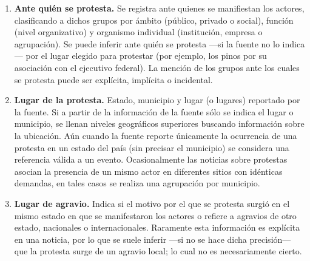 \documentclass[letterpaper, 11pt]{book}
\theoremstyle{definition}
\theoremstyle{remark}
\begin{document}
\begin{enumerate}
    
    Por último, a pesar de que nuestros datos tienen una acotación temporal que difícilmente registra ``cambios históricos''\footnote{
	Argumentación central de \citet{2003_Wada_Tesis} para justificar un \emph{análisis de demandas}, dado que diversos investigadores han considerado que las demandas reportadas por los diarios no son fidedignas, ya que son sesgadas por las impresiones de los reporteros. 
    } 
    encontramos que la justificación sobre ``filtrar demandas significativas ante una multiplicidad de discursos'' \citep[168]{2003_Wada_Tesis} es válida, considerando además que las clasificaciones establecidas funcionan adecuadamente como descripciones, enfatizadas dentro de la esfera pública. 
    
    
    
    \item \textbf{Ante quién se protesta.} Se registra ante quienes se manifiestan los actores, clasificando a dichos grupos por ámbito (público, privado o social), función (nivel organizativo) y organismo individual (institución, empresa o agrupación). 
    Se puede inferir ante quién se protesta ---si la fuente no lo indica--- por el lugar elegido para protestar (por ejemplo, los pinos por su asociación con el ejecutivo federal). La mención de los grupos ante los cuales se protesta puede ser explícita, implícita o incidental.
    

    \item \textbf{Lugar de la protesta.} Estado, municipio y lugar (o lugares) reportado por la fuente. 
    Si a partir de la información de la fuente sólo se indica el lugar o municipio, se llenan niveles geográficos superiores buscando información sobre la ubicación. 
    Aún cuando la fuente reporte únicamente la ocurrencia de una protesta en un estado del país (sin precisar el municipio) se considera una referencia válida a un evento. Ocasionalmente las noticias sobre protestas asocian la presencia de un mismo actor en diferentes sitios con idénticas demandas, en tales casos se realiza una agrupación por municipio. 
    

    \item \textbf{Lugar de agravio.} Indica si el motivo por el que se protesta surgió en el mismo estado en que se manifestaron los actores o refiere a agravios de otro estado, nacionales o internacionales. 
    Raramente esta información es explícita en una noticia, por lo que se suele inferir ---si no se hace dicha precisión--- que la protesta surge de un agravio local; lo cual no es necesariamente cierto.
    


\end{enumerate}
\end{document}
